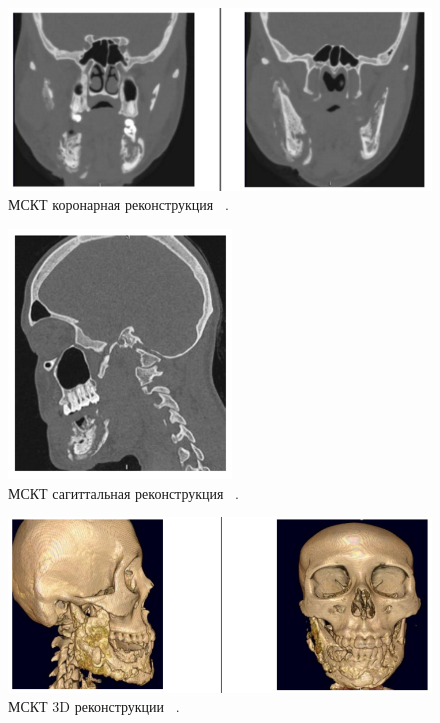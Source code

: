 \documentclass[11pt]{article}
\begin{document}
 	\begin{figure}[H]
	\centering
	\includegraphics[width=\textwidth]{mskt3}
	\caption{МСКТ коронарная реконструкция ~\cite{rejr}. }
	\label{fig:mskt3}
	\end{figure} 

 	\begin{figure}[H]
	\centering
	\includegraphics[]{mskt4}
	\caption{МСКТ сагиттальная реконструкция ~\cite{rejr}. }
	\label{fig:mskt4}
	\end{figure} 

 	\begin{figure}[H]
	\centering
	\includegraphics[width=\textwidth]{mskt5}
	\caption{МСКТ 3D реконструкции ~\cite{rejr}. }
	\label{fig:mskt5}
	\end{figure} 
\end{document}
